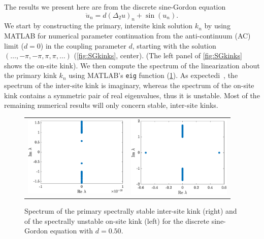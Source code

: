 \documentclass[12pt,reqno]{amsart}
\begin{document}
The results we present here are from the discrete sine-Gordon equation
\begin{equation*}
	\ddot{u}_n = d (\Delta_2 u)_n + \sin(u_n).
\end{equation*}
We start by constructing the primary, intersite kink solution $k_n$ by using MATLAB for numerical parameter continuation from the anti-continuum (AC) limit ($d = 0$) in the coupling parameter $d$, starting with the solution $(\dots, -\pi, -\pi, \pi, \pi, \dots)$ (\cref{fig:SGkinks}, center). (The left panel of \cref{fig:SGkinks} shows the on-site kink). We then compute the spectrum of the linearization about the primary kink $k_n$ using MATLAB's \texttt{eig} function (\cref{fig:kinkspec}). As expectedi~\cite{Balmforth2000,KevrekidisWeinstein2000}, the spectrum of the inter-site kink is imaginary, whereas the spectrum of the on-site kink contains a symmetric pair of real eigenvalues, thus it is unstable. Most of the remaining numerical results will only concern stable, inter-site kinks.

\begin{figure}[H]
\begin{center}
\begin{tabular}{cc}
\includegraphics[width=5cm]{1kinkspectrum.eps}	&
\includegraphics[width=5cm]{1kinkonsitespectrum.eps}
\end{tabular}
\end{center}
\caption{Spectrum of the primary spectrally stable 
inter-site kink (right) and of the spectrally unstable 
on-site kink (left) for the discrete sine-Gordon equation with $d = 0.50$.}
\label{fig:kinkspec}
\end{figure}
\end{document}
